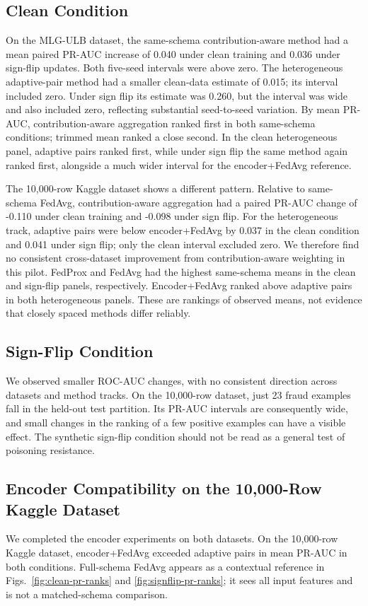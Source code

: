 \documentclass{ieeeaccess}
\begin{document}
\subsection{Clean Condition}
On the MLG-ULB dataset, the same-schema contribution-aware method had a mean
paired PR-AUC increase of 0.040 under clean training and 0.036 under
sign-flip updates. Both five-seed intervals were above zero. The heterogeneous
adaptive-pair method had a smaller clean-data estimate of 0.015; its interval
included zero. Under sign flip its estimate was 0.260, but the interval was
wide and also included zero, reflecting substantial seed-to-seed variation.
By mean PR-AUC, contribution-aware aggregation ranked first in both
same-schema conditions; trimmed mean ranked a close second. In the clean
heterogeneous panel, adaptive pairs ranked first, while under sign flip the
same method again ranked first, alongside a much wider interval for the
encoder+FedAvg reference.

The 10,000-row Kaggle dataset shows a different pattern. Relative to
same-schema FedAvg, contribution-aware aggregation had a paired PR-AUC change
of -0.110 under clean training and -0.098 under sign flip. For the
heterogeneous track, adaptive pairs were below encoder+FedAvg by 0.037 in the
clean condition and 0.041 under sign flip; only the clean interval excluded
zero. We therefore find no consistent cross-dataset improvement from
contribution-aware weighting in this pilot. FedProx and FedAvg had the highest
same-schema means in the clean and sign-flip panels, respectively.
Encoder+FedAvg ranked above adaptive pairs in both heterogeneous panels. These
are rankings of observed means, not evidence that closely spaced methods
differ reliably.

\subsection{Sign-Flip Condition}
We observed smaller ROC-AUC changes, with no consistent direction across
datasets and method tracks. On the 10,000-row dataset, just 23 fraud examples
fall in the held-out test partition. Its PR-AUC intervals are consequently
wide, and small changes in the ranking of a few positive examples can have a
visible effect. The synthetic sign-flip condition should not be read as a
general test of poisoning resistance.

\subsection{Encoder Compatibility on the 10,000-Row Kaggle Dataset}
We completed the encoder experiments on both datasets. On the 10,000-row
Kaggle dataset, encoder+FedAvg exceeded adaptive pairs in mean PR-AUC in both
conditions.
Full-schema FedAvg appears as a contextual reference in
Figs.~\ref{fig:clean-pr-ranks} and \ref{fig:signflip-pr-ranks}; it sees all
input features and is not a matched-schema comparison.
\end{document}
